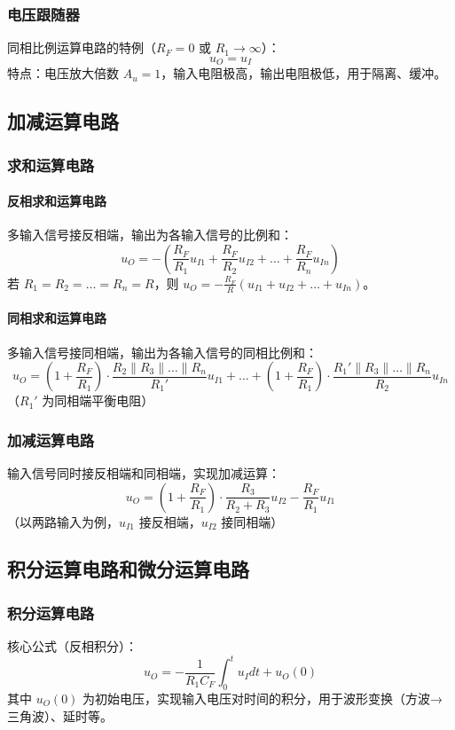 \subsubsection{电压跟随器}
同相比例运算电路的特例（$R_F = 0$ 或 $R_1 \to \infty$）：
\[ u_O = u_I \]
特点：电压放大倍数 $A_u = 1$，输入电阻极高，输出电阻极低，用于隔离、缓冲。

\subsection{加减运算电路}
\subsubsection{求和运算电路}
\paragraph{反相求和运算电路}
多输入信号接反相端，输出为各输入信号的比例和：
\[ u_O = -\left( \frac{R_F}{R_1} u_{I1} + \frac{R_F}{R_2} u_{I2} + \dots + \frac{R_F}{R_n} u_{In} \right) \]
若 $R_1 = R_2 = \dots = R_n = R$，则 $u_O = -\frac{R_F}{R} (u_{I1} + u_{I2} + \dots + u_{In})$。

\paragraph{同相求和运算电路}
多输入信号接同相端，输出为各输入信号的同相比例和：
\[ u_O = \left(1 + \frac{R_F}{R_1}\right) \cdot \frac{R_2 \parallel R_3 \parallel \dots \parallel R_n}{R_1'} u_{I1} + \dots + \left(1 + \frac{R_F}{R_1}\right) \cdot \frac{R_1' \parallel R_3 \parallel \dots \parallel R_n}{R_2} u_{In} \]
（$R_1'$ 为同相端平衡电阻）

\subsubsection{加减运算电路}
输入信号同时接反相端和同相端，实现加减运算：
\[ u_O = \left(1 + \frac{R_F}{R_1}\right) \cdot \frac{R_3}{R_2 + R_3} u_{I2} - \frac{R_F}{R_1} u_{I1} \]
（以两路输入为例，$u_{I1}$ 接反相端，$u_{I2}$ 接同相端）

\subsection{积分运算电路和微分运算电路}
\subsubsection{积分运算电路}
核心公式（反相积分）：
\[ u_O = -\frac{1}{R_1 C_F} \int_{0}^{t} u_I dt + u_O(0) \]
其中 $u_O(0)$ 为初始电压，实现输入电压对时间的积分，用于波形变换（方波→三角波）、延时等。


